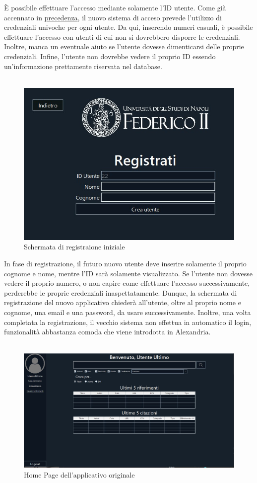 È possibile effettuare l'accesso mediante solamente l'ID utente. Come già accennato in \hyperref[nuovo:accesso]{precedenza}, il nuovo sistema di acceso prevede l'utilizzo di credenziali univoche per ogni utente. Da qui, inserendo numeri casuali, è possibile effettuare l'accesso con utenti di cui non si dovrebbero disporre le credenziali. Inoltre, manca un eventuale aiuto se l'utente dovesse dimenticarsi delle proprie credenziali. Infine, l'utente non dovrebbe vedere il proprio ID essendo un'informazione prettamente riservata nel database.
\\~\\
\begin{figure}[H]
    \centering
            \includegraphics[width=.60\textwidth]{Immagini/VecchioProgetto/registrazione.jpg} 
    \caption{Schermata di registraione iniziale}
\end{figure}

In fase di registrazione, il futuro nuovo utente deve inserire solamente il proprio cognome e nome, mentre l'ID sarà solamente visualizzato. Se l'utente non dovesse vedere il proprio numero, o non capire come effettuare l'accesso successivamente, perderebbe le proprie credenziali inaspettatamente. Dunque, la schermata di registrazione del nuovo applicativo chiederà all'utente, oltre al proprio nome e cognome, una email e una password, da usare successivamente. Inoltre, una volta completata la registrazione, il vecchio sistema non effettua in automatico il login, funzionalità abbastanza comoda che viene introdotta in Alexandria.
\\~\\
\begin{figure}[H]
    \centering
            \includegraphics[width=.80\textwidth]{Immagini/VecchioProgetto/homepage.jpg} 

    \caption{Home Page dell'applicativo originale}
\end{figure}

